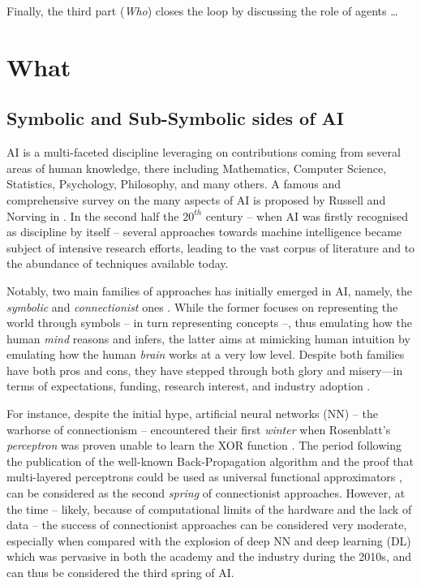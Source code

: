 \documentclass[12pt,a4paper,openright,twoside]{book}
\begin{document}
Finally, the third part (\emph{Who}) closes the loop by discussing the role of agents \ldots
{}


\part{What}
\label{part:what}

\chapter{Symbolic and Sub-Symbolic sides of AI}

AI is a multi-faceted discipline leveraging on contributions coming from several areas of human knowledge, there including Mathematics, Computer Science, Statistics, Psychology, Philosophy, and many others.
%
A famous and comprehensive survey on the many aspects of AI is proposed by Russell and Norving in \cite{russell2016artificial}.
%
In the second half the $20^{th}$ century -- when AI was firstly recognised as discipline by itself -- several approaches towards machine intelligence became subject of intensive research efforts, leading to the vast corpus of literature and to the abundance of techniques available today.

Notably, two main families of approaches has initially emerged in AI, namely, the \emph{symbolic} and \emph{connectionist} ones \cite{Smolensky1987, SUN2001783}.
%
While the former focuses on representing the world through symbols -- in turn representing concepts --, thus emulating how the human \emph{mind} reasons and infers, the latter aims at mimicking human intuition by emulating how the human \emph{brain} works at a very low level.
%
Despite both families have both pros and cons, they have stepped through both glory and misery---in terms of expectations, funding, research interest, and industry adoption \cite{Hendler2008, russell2016artificial}.

For instance, despite the initial hype, artificial neural networks (NN) -- the warhorse of connectionism -- encountered their first \emph{winter} when Rosenblatt's \emph{perceptron} \cite{rosenblatt1957perceptron} was proven unable to learn the XOR function \cite{Minsky1988}.
%
The period following the publication of the well-known Back-Propagation algorithm \cite{Bryson1979} and the proof that multi-layered perceptrons could be used as universal functional approximators \cite{Cybenko1989}, can be considered as the second \emph{spring} of connectionist approaches.
%
However, at the time -- likely, because of computational limits of the hardware and the lack of data -- the success of connectionist approaches can be considered very moderate, especially when compared with the explosion of deep NN and deep learning (DL) \cite{goodfellow2016deep} which was pervasive in both the academy and the industry during the 2010s, and can thus be considered the third spring of AI.
\end{document}
